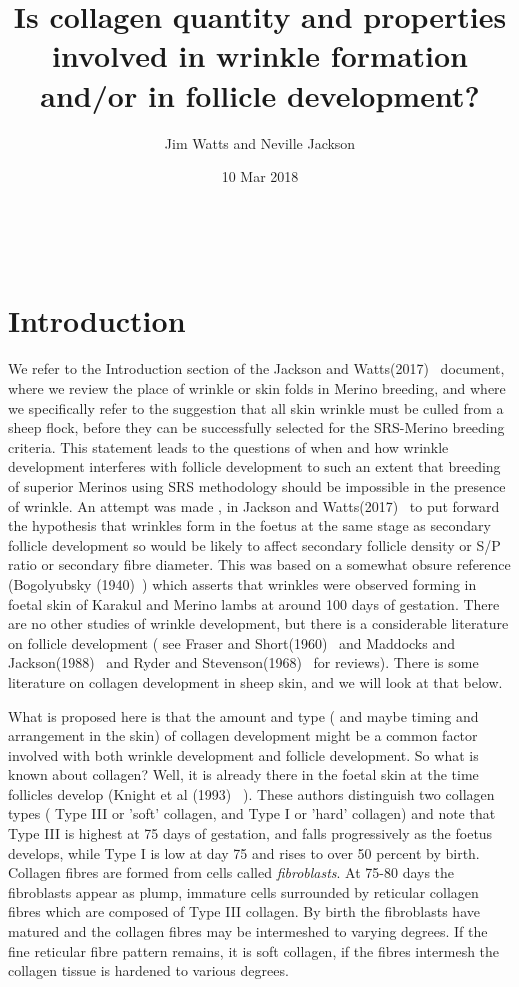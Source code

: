 \documentclass[titlepage]{article}  %
\title{Is collagen quantity and properties involved in wrinkle formation and/or in follicle development?}
\author{Jim Watts and Neville Jackson}
\date{10 Mar 2018}
\begin{document}
 


 
\maketitle      
\tableofcontents

$\newcommand{\E}{\mathrm{E}}$
$\newcommand{\Var}{\mathrm{Var}}$
$\newcommand{\Cov}{\mathrm{Cov}}$ 
$\newcommand{\SD}{\mathrm{SD}}$ 

\clearpage
\section{Introduction} 
We refer to the Introduction section of the Jackson and Watts(2017)~\cite{jack:17b} document, where we review the place of wrinkle or skin folds in Merino breeding, and where we specifically refer to the suggestion that all skin wrinkle must be culled from a sheep flock, before they can be successfully selected for the SRS-Merino breeding criteria. This statement leads to the questions of when and how wrinkle development interferes with follicle development to such an extent that breeding of superior Merinos using SRS methodology should be impossible in the presence of wrinkle. An attempt was made , in Jackson and Watts(2017)~\cite{jack:17b} to put forward the hypothesis that wrinkles form in the foetus at the same stage as secondary follicle development so would be likely to affect secondary follicle density or S/P ratio or secondary fibre diameter. This was based on a somewhat obsure reference (Bogolyubsky (1940)~\cite{bogo:40}) which asserts that wrinkles were observed forming in foetal skin of Karakul and Merino lambs at around 100 days of gestation. There are no other studies of wrinkle development, but there is a considerable literature on follicle development ( see Fraser and Short(1960)~\cite{fras:60} and Maddocks and Jackson(1988)~\cite{madd:88} and Ryder and Stevenson(1968)~\cite{ryde:68} for reviews). There is some literature on collagen development in sheep skin, and we will look at that below.

What is proposed here is that the amount and type ( and maybe timing and arrangement in the skin) of collagen development might be a common factor involved with both wrinkle development and follicle development. So what is known about collagen? Well, it is already there in the foetal skin at the time follicles develop (Knight et al (1993) ~\cite{knig:93}).  These authors distinguish two collagen types ( Type III or 'soft' collagen, and Type I or 'hard' collagen) and note  that Type III is highest at 75 days of gestation, and falls progressively as the foetus develops, while Type I is low at day 75 and rises to over 50 percent by birth. Collagen fibres are formed from cells called {\em fibroblasts}. At 75-80 days the fibroblasts appear as plump, immature cells surrounded by reticular collagen fibres which are composed of Type III collagen. By birth the fibroblasts have matured  and the collagen fibres may be intermeshed to varying degrees. If the fine reticular fibre pattern remains, it is soft collagen, if the fibres intermesh the collagen tissue is hardened to various degrees. 
\end{document}
